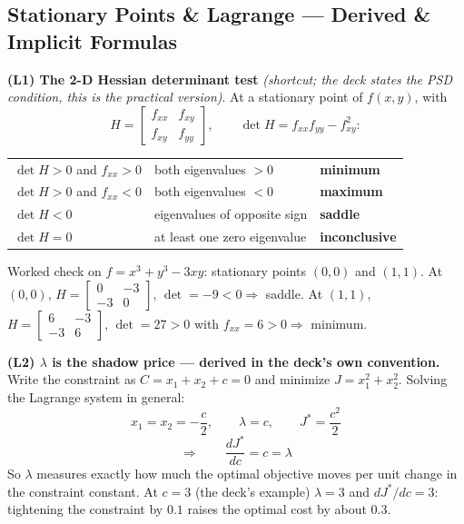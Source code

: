\subsection{Stationary Points \& Lagrange --- Derived \& Implicit Formulas}

\begin{derivedbox}
\textbf{(L1) The 2-D Hessian determinant test} \emph{(shortcut; the deck states the PSD condition, this is the practical version)}. At a stationary point of $f(x,y)$, with
\[
H = \begin{bmatrix}f_{xx} & f_{xy}\\ f_{xy} & f_{yy}\end{bmatrix},\qquad \det H = f_{xx}f_{yy}-f_{xy}^2 :
\]
\begin{center}\small
\begin{tabular}{@{}lll@{}}
\toprule
$\det H > 0$ and $f_{xx} > 0$ & both eigenvalues $>0$ & \textbf{minimum}\\
$\det H > 0$ and $f_{xx} < 0$ & both eigenvalues $<0$ & \textbf{maximum}\\
$\det H < 0$ & eigenvalues of opposite sign & \textbf{saddle}\\
$\det H = 0$ & at least one zero eigenvalue & \textbf{inconclusive}\\
\bottomrule
\end{tabular}
\end{center}
Worked check on $f = x^3+y^3-3xy$: stationary points $(0,0)$ and $(1,1)$. At $(0,0)$, $H = \begin{bmatrix}0&-3\\-3&0\end{bmatrix}$, $\det = -9 < 0 \Rightarrow$ saddle. At $(1,1)$, $H = \begin{bmatrix}6&-3\\-3&6\end{bmatrix}$, $\det = 27>0$ with $f_{xx}=6>0 \Rightarrow$ minimum.

\smallskip
\textbf{(L2) $\lambda$ is the shadow price --- derived in the deck's own convention.}
Write the constraint as $C = x_1+x_2+c = 0$ and minimize $J = x_1^2+x_2^2$. Solving the Lagrange system in general:
\[
x_1 = x_2 = -\frac{c}{2}, \qquad \lambda = c, \qquad J^\ast = \frac{c^2}{2}
\]
\[
\Longrightarrow\qquad \boxed{\frac{dJ^\ast}{dc} = c = \lambda}
\]
So $\lambda$ measures exactly how much the optimal objective moves per unit change in the constraint constant. At $c=3$ (the deck's example) $\lambda = 3$ and $dJ^\ast/dc = 3$: tightening the constraint by $0.1$ raises the optimal cost by about $0.3$.


\end{derivedbox}
